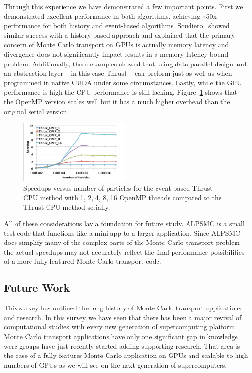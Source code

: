 Through this experience we have demonstrated a few important points.
%
First we demonstrated excellent performance in both algorithms, achieving \textasciitilde50x performance for both history and event-based algorithms.
%
Scudiero~\cite{tonyScudiero} showed similar success with a history-based approach and explained that the primary concern of Monte Carlo transport on GPUs is actually memory latency and divergence does not significantly impact results in a memory latency bound problem.
%
Additionally, these examples showed that using data parallel design and an abstraction layer -- in this case Thrust -- can preform just as well as when programmed in native CUDA under some circumstances. 
%
Lastly, while the GPU performance is high the CPU performance is still lacking.
%
Figure~\ref{fig:OMPScale} shows that the OpenMP version scales well but it has a much higher overhead than the original serial version.

\begin{figure}
\includegraphics[width=0.49\textwidth]{thrustOMPSpeedup.pdf}
\caption{Speedups versus number of particles for the event-based Thrust CPU method with 1, 2, 4, 8, 16 OpenMP threads compared to the Thrust CPU method serially.~\cite{alpsmc2}}
\label{fig:OMPScale}
\end{figure}

All of these considerations lay a foundation for future study.
%
ALPSMC is a small test code that functions like a mini app to a larger application.
%
Since ALPSMC does simplify many of the complex parts of the Monte Carlo transport problem the actual speedups may not accurately reflect the final performance possibilities of a more fully featured Monte Carlo transport code.
%

\subsection{\textbf{Future Work}}

This survey has outlined the long history of Monte Carlo transport applications and research.
%
In this survey we have seen that there has been a major revival of computational studies with every new generation of supercomputing platform.
%
Monte Carlo transport applications have only one significant gap in knowledge were groups have just recently started adding supporting research.
%
That area is the case of a fully features Monte Carlo application on GPUs and scalable to high numbers of GPUs as we will see on the next generation of supercomputers.

